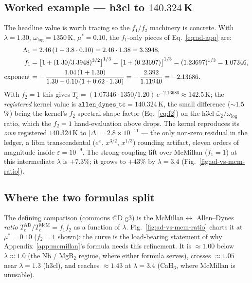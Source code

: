 \subsection{Worked example --- h3cl to $140.324$\,K}
\label{app:ad-worked}

The headline value is worth tracing so the $f_1$/$f_2$ machinery is
concrete. With $\lambda=1.30$, $\omega_{\log}=1350$\,K, $\mu^{*}=0.10$, the
$f_1$-only pieces of Eq.~\eqref{eq:ad-app} are:
\begin{align}
\Lambda_1 &= 2.46\,(1+3.8\cdot0.10) = 2.46\cdot1.38 = 3.3948, \notag\\
f_1 &= \big[1+(1.30/3.3948)^{3/2}\big]^{1/3}
     = \big[1+(0.23697)\big]^{1/3} = (1.23697)^{1/3} = 1.07346, \notag\\
\text{exponent} &= -\,\frac{1.04\,(1+1.30)}{1.30 - 0.10\,(1+0.62\cdot1.30)}
     = -\,\frac{2.392}{1.11940} = -2.13686. \notag
\end{align}
With $f_2\!=\!1$ this gives $T_c=(1.07346\cdot1350/1.20)\,e^{-2.13686}
\approx142.5$\,K; the \emph{registered} kernel value is
$\texttt{allen\_dynes\_tc}=140.324$\,K, the small difference
($\sim\!1.5$\%) being the kernel's $f_2$ spectral-shape factor
(Eq.~\ref{eq:f2}) on the h3cl $\bar\omega_2/\omega_{\log}$ ratio, which the
$f_2\!=\!1$ hand-evaluation above drops. The kernel reproduces its
\emph{own} registered $140.324$\,K to $|\Delta|=2.8\times10^{-11}$ --- the
only non-zero residual in the ledger, a libm transcendental ($e^x$,
$x^{3/2}$, $x^{1/3}$) rounding artifact, eleven orders of magnitude inside
$\varepsilon=10^{-9}$. The strong-coupling lift over McMillan
($f_1\!=\!1$) at this intermediate $\lambda$ is $+7.3$\%; it grows to
$+43$\% by $\lambda=3.4$ (Fig.~\ref{fig:ad-vs-mcm-ratio}).

\subsection{Where the two formulas split}
\label{app:ad-split}

The defining comparison (commons @D g3) is the McMillan$\leftrightarrow$
Allen--Dynes \emph{ratio} $T_c^{\text{AD}}/T_c^{\text{McM}}=f_1 f_2$ as a
function of $\lambda$. Fig.~\ref{fig:ad-vs-mcm-ratio} charts it at
$\mu^{*}=0.10$ ($f_2\!=\!1$ shown): the curve is the load-bearing
statement of why Appendix~\ref{app:mcmillan}'s formula needs this
refinement. It is $\approx\!1.00$ below $\lambda\!\approx\!1.0$
(the Nb / MgB$_2$ regime, where either formula serves), crosses
$\approx\!1.05$ near $\lambda\!=\!1.3$ (h3cl), and reaches $\approx\!1.43$
at $\lambda\!=\!3.4$ (CaH$_6$, where McMillan is unusable).

